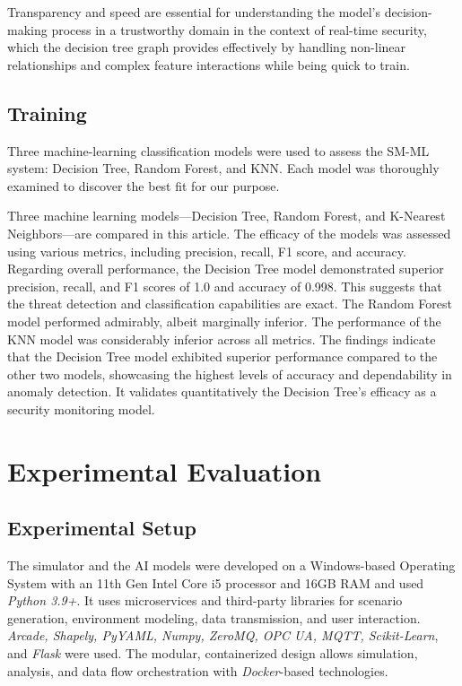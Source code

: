 \documentclass[conference]{IEEEtran}
\begin{document}
Transparency and speed are essential for understanding the model's decision-making process in a trustworthy domain in the context of real-time security, which the decision tree graph provides effectively by handling non-linear relationships and complex feature interactions while being quick to train.

\subsection{Training}
Three machine-learning classification models were used to assess the SM-ML system: Decision Tree, Random Forest, and KNN. Each model was thoroughly examined to discover the best fit for our purpose. 

Three machine learning models—Decision Tree, Random Forest, and K-Nearest Neighbors—are compared in this article. The efficacy of the models was assessed using various metrics, including precision, recall, F1 score, and accuracy. Regarding overall performance, the Decision Tree model demonstrated superior precision, recall, and F1 scores of 1.0 and accuracy of 0.998. This suggests that the threat detection and classification capabilities are exact. The Random Forest model performed admirably, albeit marginally inferior. The performance of the KNN model was considerably inferior across all metrics. The findings indicate that the Decision Tree model exhibited superior performance compared to the other two models, showcasing the highest levels of accuracy and dependability in anomaly detection. It validates quantitatively the Decision Tree's efficacy as a security monitoring model.

\section{Experimental Evaluation}
\subsection{Experimental Setup}

The simulator and the AI models were developed on a Windows-based Operating System with an 11th Gen Intel Core i5 processor and 16GB RAM and used \textit{Python 3.9+}. It uses microservices and third-party libraries for scenario generation, environment modeling, data transmission, and user interaction. \textit{Arcade, Shapely, PyYAML, Numpy, ZeroMQ, OPC UA, MQTT, Scikit-Learn}, and \textit{Flask} were used. The modular, containerized design allows simulation, analysis, and data flow orchestration with \textit{Docker}-based technologies. 
\end{document}
